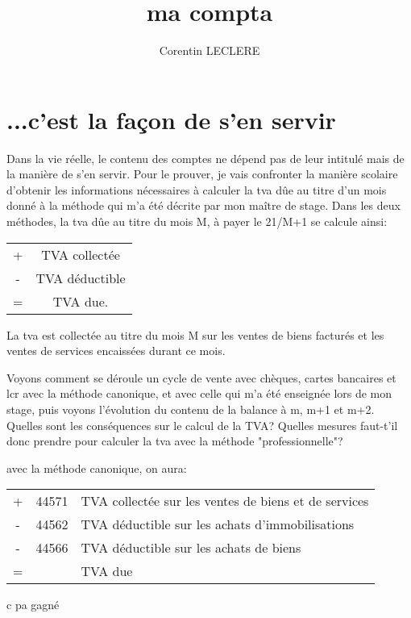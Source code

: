 \documentclass[12pt,a4paper,twoside]{book}
\author{Corentin LECLERE}
\title{ma compta}
\begin{document}
\chapter{...c'est la façon de s'en servir}

Dans la vie réelle, le contenu des comptes ne dépend pas de leur intitulé mais de la manière de s'en servir. Pour le prouver, je vais confronter la manière scolaire d'obtenir les informations nécessaires à calculer la tva dûe au titre d'un mois donné à la méthode qui m'a été décrite par mon maître de stage. 
Dans les deux méthodes, la tva dûe au titre du mois M, à payer le 21/M+1 se calcule ainsi: 

%


\begin{tabular}{cc}
   +&TVA collectée \\
  -&TVA déductible \\
  \hline
  =&TVA due.
\end{tabular}


La tva est collectée au titre du mois M sur les ventes de biens facturés et les ventes de services encaissées durant ce mois. 

Voyons comment se déroule un cycle de vente avec chèques, cartes bancaires et lcr avec la méthode canonique, et avec celle qui m'a été enseignée lors de mon stage, puis voyons l'évolution du contenu de la balance à m, m+1 et m+2. Quelles sont les conséquences sur le calcul de la TVA? Quelles mesures faut-t'il donc prendre pour calculer la tva avec la méthode "professionnelle"? 


avec la méthode canonique, on aura: 


\begin{tabular}{ccl}
+&44571&TVA collectée sur les ventes de biens et de services\\
-&44562&TVA déductible sur les achats d'immobilisations\\
-&44566&TVA déductible sur les achats de biens\\
\hline
=&&TVA due\\
\end{tabular}
 c pa gagné
 
\end{document}
